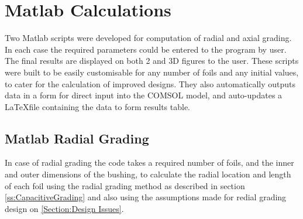 \section{Matlab Calculations}
Two Matlab scripts were developed for computation of radial and axial grading. In each case the required parameters could be entered to the program by user. The final results are displayed on both 2 and 3D figures to the user. These scripts were built to be easily customisable for any number of foils and any initial values, to cater for the calculation of improved designs. They also automatically outputs data in a form for direct input into the COMSOL model, and auto-updates a \LaTeX  file containing the data to form results table.

\subsection{Matlab Radial Grading}
 In case of radial grading  the code takes a required number of foils, and the inner and outer dimensions of the bushing, to calculate the radial location and length of each foil using the radial grading method as described in section \ref{ss:CapacitiveGrading} and also using the assumptions made for redial grading design on \ref{Section:Design Issues}. 


